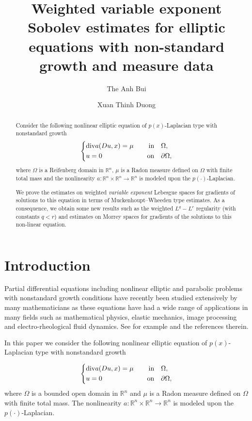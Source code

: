 \documentclass[a4paper,10pt]{amsart}
\title[Regularity estimates for elliptic equations with non-standard
growth]{Weighted variable exponent Sobolev estimates for elliptic equations with non-standard
	growth and measure data}         %
\author{The Anh Bui}
\author{Xuan Thinh Duong}
\newcommand{\Om}{\Omega}
\newcommand{\Rn}{\mathbb{R}^n}
\newcommand{\di}{{\rm div}}
\begin{document}
\begin{abstract}
Consider the following nonlinear elliptic equation of $p(x)$-Laplacian type with nonstandard growth 
\begin{equation*}
\left\{
\begin{aligned}
&\di  a(Du, x)=\mu \quad &\text{in}& \quad \Om,\\
&u=0  \quad &\text{on}& \quad \partial\Om,
\end{aligned}
\right.
\end{equation*}
where $\Om$ is a Reifenberg domain in $\Rn$, $\mu$ is a Radon measure defined on $\Om$ with finite total mass and the nonlinearity $a: \mathbb{R}^n\times \mathbb{R}^n\to \mathbb{R}^n$ is modeled upon the $p(\cdot)$-Laplacian. 


We prove the estimates on weighted {\it variable exponent} Lebesgue spaces for gradients of  solutions to this equation 
in terms of Muckenhoupt--Wheeden type estimates. As a consequence, we obtain some  
new results such as the weighted $L^q-L^r$ regularity (with constants $q  < r$) and estimates on Morrey spaces for gradients of the solutions to this non-linear equation.
\end{abstract}
\date{}


\maketitle

\tableofcontents

\section{Introduction}
Partial differential equations including nonlinear elliptic and parabolic problems with nonstandard growth conditions 
have recently been studied extensively by many mathematicians as these equations have had a wide 
range of applications in many fields such as mathematical physics,  elastic mechanics, image processing and electro-rheological fluid dynamics. See for example \cite{AM1, AM2, BOR, DR,CLR,Hetal, RR, R, Ru, ZZ, Z} and the references therein.
 
In this paper we consider the following nonlinear elliptic equation of $p(x)$-Laplacian type with nonstandard growth 

\begin{equation}\label{Maineq}
\left\{
\begin{aligned}
&\di  a(Du, x)=\mu \quad &\text{in}& \quad \Om,\\
&u=0  \quad &\text{on}& \quad \partial\Om,
\end{aligned}
\right.
\end{equation}
where $\Om$ is a bounded open domain in $\Rn$ and $\mu$ is a Radon measure defined on $\Om$ with finite total mass. The nonlinearity $a: \mathbb{R}^n\times \mathbb{R}^n\to \mathbb{R}^n$ is modeled upon the $p(\cdot)$-Laplacian. 
\end{document}
